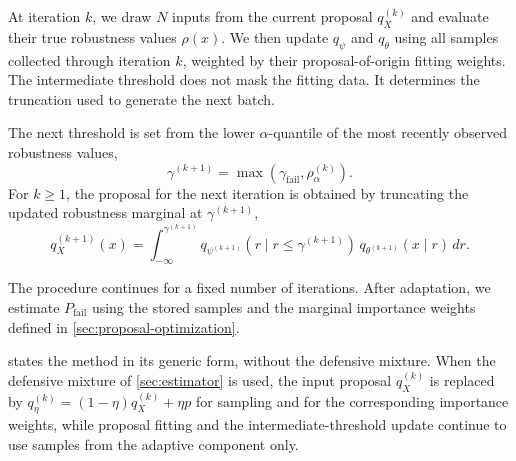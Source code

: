 \documentclass[twoside,11pt]{article}
\begin{document}
At iteration $k$, we draw $N$ inputs from the current proposal $q_X^{(k)}$ and evaluate their true robustness values $\rho(x)$. We then update $q_{\psi}$ and $q_{\theta}$ using all samples collected through iteration $k$, weighted by their proposal-of-origin fitting weights. The intermediate threshold does not mask the fitting data. It determines the truncation used to generate the next batch.

The next threshold is set from the lower $\alpha$-quantile of the most recently observed robustness values,
\[
    \gamma^{(k+1)}
    =
    \max\!\left(
        \gamma_{\mathrm{fail}},
        \rho_\alpha^{(k)}
    \right).
\]
For $k\geq 1$, the proposal for the next iteration is obtained by truncating the updated robustness marginal at $\gamma^{(k+1)}$,
\[
    q_X^{(k+1)}(x)
    =
    \int_{-\infty}^{\gamma^{(k+1)}}
    q_{\psi^{(k+1)}}(r\mid r\leq\gamma^{(k+1)})\,
    q_{\theta^{(k+1)}}(x\mid r)\,dr.
\]

The procedure continues for a fixed number of iterations. After adaptation, we estimate $P_{\mathrm{fail}}$ using the stored samples and the marginal importance weights defined in \cref{sec:proposal-optimization}.

 states the method in its generic form, without the defensive mixture. When the defensive mixture of \cref{sec:estimator} is used, the input proposal $q_X^{(k)}$ is replaced by $q_\eta^{(k)}=(1-\eta)q_X^{(k)}+\eta p$ for sampling and for the corresponding importance weights, while proposal fitting and the intermediate-threshold update continue to use samples from the adaptive component only.

\end{document}
